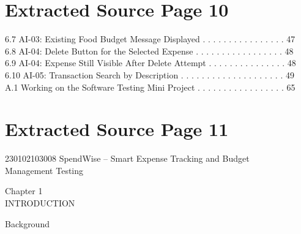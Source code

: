 \documentclass[12pt,a4paper]{report}
\begin{document}
\clearpage
\section*{Extracted Source Page 10}
6.7 AI-03: Existing Food Budget Message Displayed . . . . . . . . . . . . . . . .       47\\ 
6.8 AI-04: Delete Button for the Selected Expense . . . . . . . . . . . . . . . . .     48\\ 
6.9 AI-04: Expense Still Visible After Delete Attempt . . . . . . . . . . . . . . .     48\\ 
6.10 AI-05: Transaction Search by Description . . . . . . . . . . . . . . . . . . . .   49\\ 

\smallskip
A.1 Working on the Software Testing Mini Project . . . . . . . . . . . . . . . . .      65\\ 

\clearpage
\section*{Extracted Source Page 11}
230102103008                           SpendWise – Smart Expense Tracking and Budget\\ 
Management Testing\\ 

\smallskip

\smallskip

\smallskip
Chapter 1\\ 
INTRODUCTION\\ 

\smallskip

 Background\\ 
\end{document}
